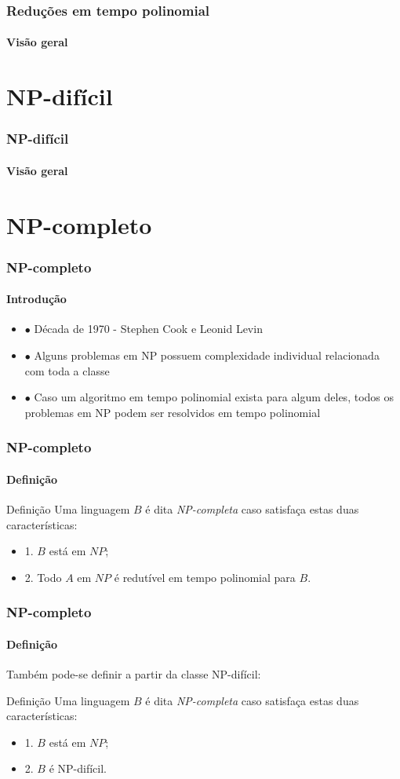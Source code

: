 \documentclass{beamer}
\begin{document}
\begin{frame}
\frametitle{Reduções em tempo polinomial}
\framesubtitle{Visão geral}
\end{frame}

\section{NP-difícil}

\begin{frame}
\frametitle{NP-difícil}
\framesubtitle{Visão geral}
\end{frame}

\section{NP-completo}

\begin{frame}
\frametitle{NP-completo}
\framesubtitle{Introdução}

\begin{itemize}
    \item $\bullet$ Década de 1970 - Stephen Cook e Leonid Levin
    \item $\bullet$ Alguns problemas em NP possuem complexidade individual relacionada com toda a classe
    \item $\bullet$ Caso um algoritmo em tempo polinomial exista para algum deles, todos os problemas em NP podem ser resolvidos em tempo polinomial
\end{itemize}
\bigskip

\end{frame}

\begin{frame}
\frametitle{NP-completo}
\framesubtitle{Definição}


\begin{block}{Definição}
Uma linguagem $B$ é dita \textit{NP-completa} caso satisfaça estas duas características:
\begin{itemize}
	\item 1. $B$ está em $NP$;
	\item 2. Todo $A$ em $NP$ é redutível em tempo polinomial para $B$.
\end{itemize}
\end{block}
\end{frame}

\begin{frame}
\frametitle{NP-completo}
\framesubtitle{Definição}

Também pode-se definir a partir da classe NP-difícil:

\begin{block}{Definição}
	Uma linguagem $B$ é dita \textit{NP-completa} caso satisfaça estas duas características:
	\begin{itemize}
		\item 1. $B$ está em $NP$;
		\item 2. $B$ é NP-difícil.
	\end{itemize}
\end{block}

\end{frame}
\end{document}
